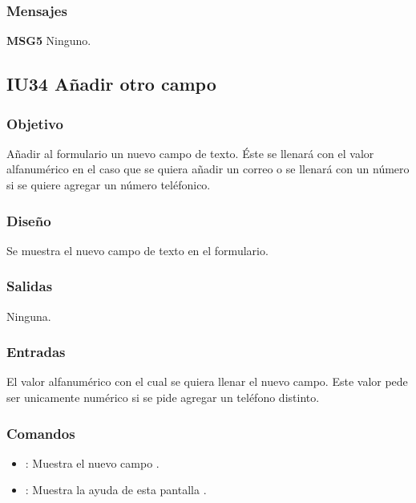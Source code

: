 \subsubsection{Mensajes}
	\begin{Citemize}
		\item {\bf MSG5} Ninguno.
	\end{Citemize}


\subsection{IU34 Añadir otro campo}

\subsubsection{Objetivo}
	Añadir al formulario un nuevo campo de texto. Éste se llenará con el valor alfanumérico en el caso que se quiera añadir un correo o se llenará con un número si se quiere agregar un número teléfonico.

\subsubsection{Diseño}
	Se muestra el nuevo campo de texto en el formulario.


\subsubsection{Salidas}

	Ninguna.

\subsubsection{Entradas}
	El valor alfanumérico con el cual se quiera llenar el nuevo campo. Este valor pede ser unicamente numérico si se pide agregar un teléfono distinto.

\subsubsection{Comandos}
\begin{itemize}
	\item {}: Muestra el nuevo campo .
	\item {}: Muestra la ayuda de esta pantalla .
\end{itemize}

